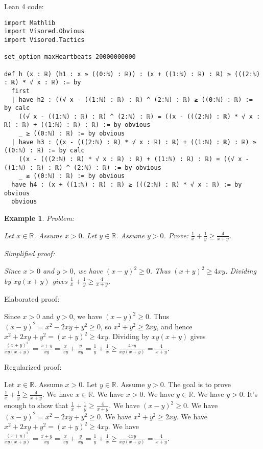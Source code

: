 \documentclass{article}
\newtheorem{example}{Example}
\begin{document}
Lean 4 code:
\begin{tcolorbox}[colback=white!10, width=\linewidth]
\begin{lstlisting}[language=Lean4]
import Mathlib
import Visored.Obvious
import Visored.Tactics

set_option maxHeartbeats 20000000000

def h (x : ℝ) (h1 : x ≥ ((0:ℕ) : ℝ)) : (x + ((1:ℕ) : ℝ) : ℝ) ≥ (((2:ℕ) : ℝ) * √ x : ℝ) := by
  first
  | have h2 : ((√ x - ((1:ℕ) : ℝ) : ℝ) ^ (2:ℕ) : ℝ) ≥ ((0:ℕ) : ℝ) := by calc
    ((√ x - ((1:ℕ) : ℝ) : ℝ) ^ (2:ℕ) : ℝ) = ((x - (((2:ℕ) : ℝ) * √ x : ℝ) : ℝ) + ((1:ℕ) : ℝ) : ℝ) := by obvious
    _ ≥ ((0:ℕ) : ℝ) := by obvious
  | have h3 : ((x - (((2:ℕ) : ℝ) * √ x : ℝ) : ℝ) + ((1:ℕ) : ℝ) : ℝ) ≥ ((0:ℕ) : ℝ) := by calc
    ((x - (((2:ℕ) : ℝ) * √ x : ℝ) : ℝ) + ((1:ℕ) : ℝ) : ℝ) = ((√ x - ((1:ℕ) : ℝ) : ℝ) ^ (2:ℕ) : ℝ) := by obvious
    _ ≥ ((0:ℕ) : ℝ) := by obvious
  have h4 : (x + ((1:ℕ) : ℝ) : ℝ) ≥ (((2:ℕ) : ℝ) * √ x : ℝ) := by obvious
  obvious

\end{lstlisting}
\end{tcolorbox}


\begin{example}
Problem:
\begin{tcolorbox}[colback=yellow!10, width=\linewidth]
Let $x\in\mathbb{R}$. Assume $x>0$.
    Let $y\in\mathbb{R}$. Assume $y>0$.
    Prove: $\frac{1}{x} + \frac{1}{y} \ge \frac{4}{x+y}$.
\end{tcolorbox}

Simplified proof:
\begin{tcolorbox}[colback=blue!10, width=\linewidth]
Since $x>0$ and $y>0$, we have $(x-y)^2 \ge 0$. Thus $(x+y)^2 \ge 4xy$. Dividing by $xy(x+y)$ gives $\frac{1}{x}+\frac{1}{y} \ge \frac{4}{x+y}$.
\end{tcolorbox}
\end{example}

Elaborated proof:
\begin{tcolorbox}[colback=green!10, width=\linewidth]
Since $x>0$ and $y>0$, we have $(x-y)^2 \ge 0$. Thus $(x-y)^2 = x^2 -2xy + y^2 \ge 0$, so $x^2 + y^2 \ge 2xy$, and hence $x^2 + 2xy + y^2 = (x+y)^2 \ge 4xy$. Dividing by $xy(x+y)$ gives $\frac{(x+y)^2}{xy(x+y)} = \frac{x+y}{xy} = \frac{x}{xy} + \frac{y}{xy} = \frac{1}{y}+\frac{1}{x} \ge \frac{4xy}{xy(x+y)} = \frac{4}{x+y}$.
\end{tcolorbox}

Regularized proof:
\begin{tcolorbox}[colback=red!10, width=\linewidth]
Let $x\in\mathbb{R}$.
Assume $x>0$.
Let $y\in\mathbb{R}$.
Assume $y>0$.
The goal is to prove $\frac{1}{x} + \frac{1}{y} \ge \frac{4}{x+y}$.
We have $x \in \mathbb{R}$.
We have $x>0$.
We have $y \in \mathbb{R}$.
We have $y>0$.
It's enough to show that $\frac{1}{x} + \frac{1}{y} \ge \frac{4}{x+y}$.
We have ${(x-y)}^2 \ge 0$.
We have ${(x-y)}^2 = x^2 -2xy + y^2 \ge 0$.
We have $x^2 + y^2 \ge 2xy$.
We have $x^2 + 2xy + y^2 = {(x+y)}^2 \ge 4xy$.
We have $\frac{{(x+y)}^2}{xy(x+y)} = \frac{x+y}{xy} = \frac{x}{xy} + \frac{y}{xy} = \frac{1}{y}+\frac{1}{x} \ge \frac{4xy}{xy(x+y)} = \frac{4}{x+y}$.
\end{tcolorbox}
\end{document}
